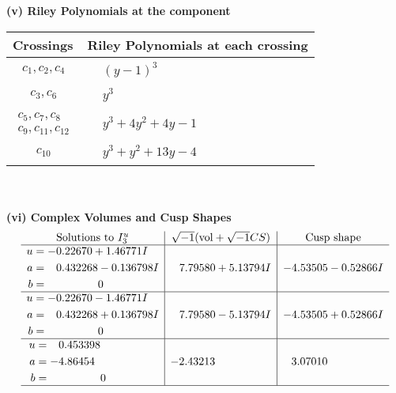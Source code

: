 \documentclass[1p]{elsarticle_modified}
\theoremstyle{definition}
\newcommand{\I}{\sqrt{-1}}
\begin{document}
\flushleft \textbf{(v) Riley Polynomials at the component}\newline \\
\begin{tabular}{m{50pt}|m{274pt}}
Crossings & \hspace{64pt}Riley Polynomials at each crossing \\
\hline $$\begin{aligned}c_{1},c_{2},c_{4}\end{aligned}$$&$\begin{aligned}
&(y-1)^3
\end{aligned}$\\
\hline $$\begin{aligned}c_{3},c_{6}\end{aligned}$$&$\begin{aligned}
&y^3
\end{aligned}$\\
\hline $$\begin{aligned}c_{5},c_{7},c_{8}\\c_{9},c_{11},c_{12}\end{aligned}$$&$\begin{aligned}
&y^3+4 y^2+4 y-1
\end{aligned}$\\
\hline $$\begin{aligned}c_{10}\end{aligned}$$&$\begin{aligned}
&y^3+y^2+13 y-4
\end{aligned}$\\
\hline
\end{tabular}\\~\\
\newpage\flushleft \textbf{(vi) Complex Volumes and Cusp Shapes}
$$\begin{array}{c|c|c}  
\text{Solutions to }I^u_{3}& \I (\text{vol} + \sqrt{-1}CS) & \text{Cusp shape}\\
 \hline 
\begin{aligned}
u &= -0.22670 + 1.46771 I \\
a &= \phantom{-}0.432268 - 0.136798 I \\
b &= \phantom{-0.000000 } 0\end{aligned}
 & \phantom{-}7.79580 + 5.13794 I & -4.53505 - 0.52866 I \\ \hline\begin{aligned}
u &= -0.22670 - 1.46771 I \\
a &= \phantom{-}0.432268 + 0.136798 I \\
b &= \phantom{-0.000000 } 0\end{aligned}
 & \phantom{-}7.79580 - 5.13794 I & -4.53505 + 0.52866 I \\ \hline\begin{aligned}
u &= \phantom{-}0.453398\phantom{ +0.000000I} \\
a &= -4.86454\phantom{ +0.000000I} \\
b &= \phantom{-0.000000 } 0\end{aligned}
 & -2.43213\phantom{ +0.000000I} & \phantom{-}3.07010\phantom{ +0.000000I}\\
 \hline 
 \end{array}$$\newpage\newpage\renewcommand{\arraystretch}{1}
\end{document}
